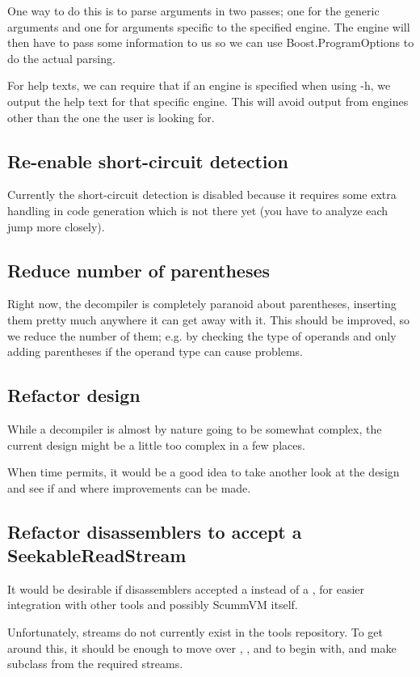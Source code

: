 One way to do this is to parse arguments in two passes; one for the generic arguments and one for arguments specific to the specified engine. The engine will then have to pass some information to us so we can use Boost.ProgramOptions to do the actual parsing.

For help texts, we can require that if an engine is specified when using -h, we output the help text for that specific engine. This will avoid output from engines other than the one the user is looking for.

\subsection{Re-enable short-circuit detection}
Currently the short-circuit detection is disabled because it requires some extra handling in code generation which is not there yet (you have to analyze each jump more closely).

\subsection{Reduce number of parentheses}
Right now, the decompiler is completely paranoid about parentheses, inserting them pretty much anywhere it can get away with it. This should be improved, so we reduce the number of them; e.g. by checking the type of operands and only adding parentheses if the operand type can cause problems.

\subsection{Refactor design}
While a decompiler is almost by nature going to be somewhat complex, the current design might be a little too complex in a few places.

When time permits, it would be a good idea to take another look at the design and see if and where improvements can be made.

\subsection{Refactor disassemblers to accept a SeekableReadStream}
It would be desirable if disassemblers accepted a  instead of a , for easier integration with other tools and possibly ScummVM itself.

Unfortunately, streams do not currently exist in the tools repository. To get around this, it should be enough to move over , , and  to begin with, and make  subclass from the required streams.

